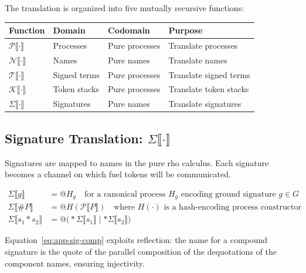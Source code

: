 \documentclass[11pt,a4paper]{article}
\makeatletter
\newcommand{\lsem}{\llbracket}
\newcommand{\rsem}{\rrbracket}
\newcommand{\Par}{\mathbin{|}}
\newcommand{\drop}[1]{{\ast} #1}
\newcommand{\quot}[1]{@#1}
\newcommand{\comp}{\mathbin{*}}
\newcommand{\hashf}{\texttt{\#}}
\makeatother
\begin{document}
The translation is organized into five mutually recursive
functions:

\begin{center}
  \begin{tabular}{llll}
    \textbf{Function} & \textbf{Domain} & \textbf{Codomain}
      & \textbf{Purpose} \\
    \midrule
    $\mathcal{P}\lsem\cdot\rsem$
      & Processes   & Pure processes
      & Translate processes \\
    $\mathcal{N}\lsem\cdot\rsem$
      & Names       & Pure names
      & Translate names \\
    $\mathcal{T}\lsem\cdot\rsem$
      & Signed terms & Pure processes
      & Translate signed terms \\
    $\mathcal{K}\lsem\cdot\rsem$
      & Token stacks & Pure processes
      & Translate token stacks \\
    $\Sigma\lsem\cdot\rsem$
      & Signatures  & Pure names
      & Translate signatures \\
  \end{tabular}
\end{center}

\subsection{Signature Translation: $\Sigma\lsem\cdot\rsem$}
\label{app:sig-trans}

Signatures are mapped to names in the pure rho calculus.  Each
signature becomes a channel on which fuel tokens will be
communicated.

\begin{align}
  \Sigma\lsem g \rsem
    &= \quot{H_g}
    \quad\text{for a canonical process~$H_g$ encoding ground
      signature~$g \in G$}
    \label{eq:app-sig-ground}
  \\[4pt]
  \Sigma\lsem \hashf P \rsem
    &= \quot{H(\mathcal{P}\lsem P \rsem)}
    \quad\text{where~$H(\cdot)$ is a hash-encoding process
      constructor}
    \label{eq:app-sig-hash}
  \\[4pt]
  \Sigma\lsem s_1 \comp s_2 \rsem
    &= \quot{\bigl(
        \drop{\Sigma\lsem s_1 \rsem}
        \Par
        \drop{\Sigma\lsem s_2 \rsem}
      \bigr)}
    \label{eq:app-sig-comp}
\end{align}

\noindent
Equation~\eqref{eq:app-sig-comp} exploits reflection: the
name for a compound signature is the quote of the parallel
composition of the dequotations of the component names,
ensuring injectivity.
\end{document}
